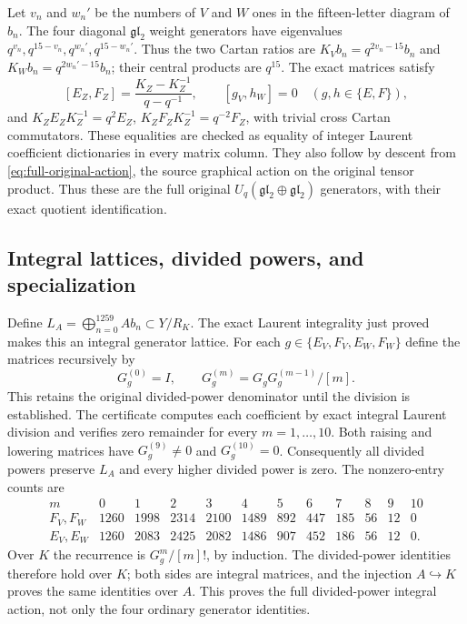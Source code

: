 Let $v_n$ and $w_n'$ be the numbers of $V$ and $W$ ones in
the fifteen-letter diagram of $b_n$. The four diagonal
$\mathfrak{gl}_2$ weight generators have eigenvalues
$q^{v_n},q^{15-v_n},q^{w_n'},q^{15-w_n'}$. Thus the two
Cartan ratios are
$K_Vb_n=q^{2v_n-15}b_n$ and
$K_Wb_n=q^{2w_n'-15}b_n$; their central products are $q^{15}$.
The exact matrices satisfy
\[
 [E_Z,F_Z]=\frac{K_Z-K_Z^{-1}}{q-q^{-1}},\qquad
 [g_V,h_W]=0\quad(g,h\in\{E,F\}),
\]
and $K_ZE_ZK_Z^{-1}=q^2E_Z$,
$K_ZF_ZK_Z^{-1}=q^{-2}F_Z$, with trivial cross Cartan
commutators. These equalities are checked as equality of
integer Laurent coefficient dictionaries in every matrix
column. They also follow by descent from
\eqref{eq:full-original-action}, the source graphical action
on the original tensor product. Thus these are the full
original $U_q(\mathfrak{gl}_2\oplus\mathfrak{gl}_2)$
generators, with their exact quotient identification.

\subsection{Integral lattices, divided powers, and specialization}

Define $L_A=\bigoplus_{n=0}^{1259}Ab_n\subset Y/R_K$.
The exact Laurent integrality just proved makes this an
integral generator lattice. For each $g\in\{E_V,F_V,E_W,F_W\}$
define the matrices recursively by
\[
 G_g^{(0)}=I,\qquad G_g^{(m)}=G_gG_g^{(m-1)}/[m].
\]
This retains the original divided-power denominator until the
division is established. The certificate computes each
coefficient by exact integral Laurent division and verifies
zero remainder for every $m=1,\ldots,10$. Both raising and
lowering matrices have $G_g^{(9)}\ne0$ and $G_g^{(10)}=0$.
Consequently all divided powers preserve $L_A$ and every
higher divided power is zero. The nonzero-entry counts are
\[
\begin{array}{c|rrrrrrrrrrr}
m&0&1&2&3&4&5&6&7&8&9&10\\\hline
F_V,F_W&1260&1998&2314&2100&1489&892&447&185&56&12&0\\
E_V,E_W&1260&2083&2425&2082&1486&907&452&186&56&12&0.
\end{array}
\]
Over $K$ the recurrence is $G_g^m/[m]!$, by induction.
The divided-power identities therefore hold over $K$; both
sides are integral matrices, and the injection $A\hookrightarrow K$
proves the same identities over $A$. This proves the full
divided-power integral action, not only the four ordinary
generator identities.

